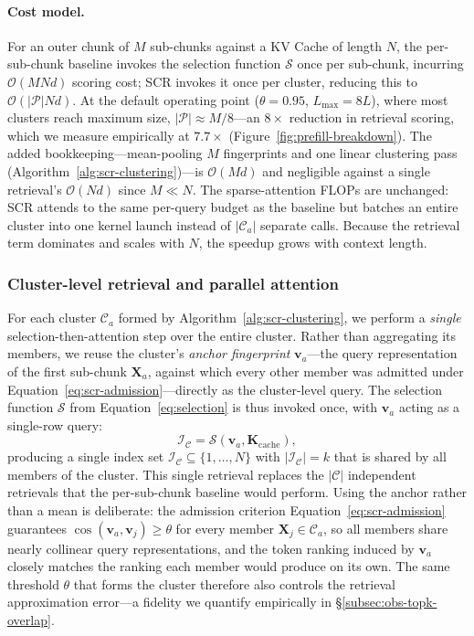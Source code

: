 \documentclass[10pt,conference]{IEEEtran}
\begin{document}
\paragraph{Cost model.} For an outer chunk of $M$ sub-chunks against a KV
Cache of length $N$, the per-sub-chunk baseline invokes the selection
function $\mathcal{S}$ once per sub-chunk, incurring $\mathcal{O}(MNd)$
scoring cost; SCR invokes it once per cluster, reducing this to
$\mathcal{O}(|\mathcal{P}|Nd)$. At the default operating point
($\theta\!=\!0.95$, $L_{\max}\!=\!8L$), where most clusters reach maximum
size, $|\mathcal{P}|\approx M/8$---an $8\times$ reduction in retrieval
scoring, which we measure empirically at $7.7\times$
(Figure~\ref{fig:prefill-breakdown}). The added bookkeeping---mean-pooling $M$
fingerprints and one linear clustering pass
(Algorithm~\ref{alg:scr-clustering})---is $\mathcal{O}(Md)$ and negligible
against a single retrieval's $\mathcal{O}(Nd)$ since $M\ll N$. The
sparse-attention FLOPs are unchanged: SCR attends to the same per-query
budget as the baseline but batches an entire cluster into one kernel
launch instead of $|\mathcal{C}_a|$ separate calls. Because the retrieval
term dominates and scales with $N$, the speedup grows with context
length.

\subsubsection{Cluster-level retrieval and parallel attention}
\label{subsubsec:scr-retrieval}

For each cluster $\mathcal{C}_a$ formed by
Algorithm~\ref{alg:scr-clustering}, we perform a \textit{single}
selection-then-attention step over the entire cluster. Rather than
aggregating its members, we reuse the cluster's \textit{anchor
fingerprint} $\mathbf{v}_a$---the query representation of the first
sub-chunk $\mathbf{X}_a$, against which every other member was admitted
under Equation~\eqref{eq:scr-admission}---directly as the cluster-level
query. The selection function $\mathcal{S}$ from
Equation~\eqref{eq:selection} is thus invoked once, with $\mathbf{v}_a$
acting as a single-row query:
\begin{equation}
    \mathcal{I}_{\mathcal{C}} = \mathcal{S}(\mathbf{v}_a, \mathbf{K}_{\text{cache}}),
    \label{eq:scr-cluster-selection}
\end{equation}
producing a single index set
$\mathcal{I}_{\mathcal{C}} \subseteq \{1, \ldots, N\}$ with
$|\mathcal{I}_{\mathcal{C}}| = k$ that is shared by all members of the
cluster. This single retrieval replaces the $|\mathcal{C}|$ independent
retrievals that the per-sub-chunk baseline would perform. Using the
anchor rather than a mean is deliberate: the admission criterion
Equation~\eqref{eq:scr-admission} guarantees
$\cos(\mathbf{v}_a, \mathbf{v}_j) \geq \theta$ for every member
$\mathbf{X}_j \in \mathcal{C}_a$, so all members share nearly collinear
query representations, and the token ranking induced by $\mathbf{v}_a$
closely matches the ranking each member would produce on its own. The
same threshold $\theta$ that forms the cluster therefore also controls
the retrieval approximation error---a fidelity we quantify empirically
in §\ref{subsec:obs-topk-overlap}.
\end{document}
